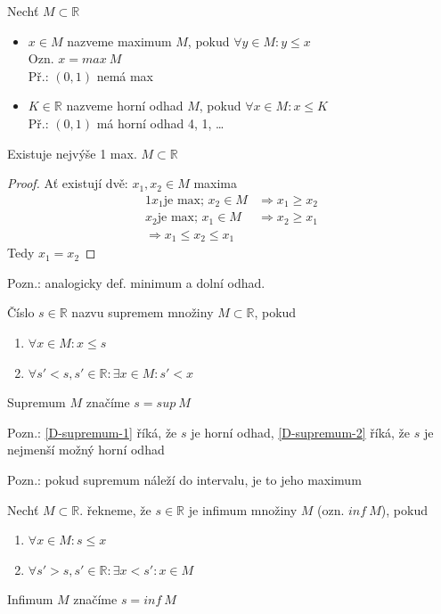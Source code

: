 \begin{definition}[Maximum]
	Nechť $M\subset\mathbb{R}$
	\begin{itemize}
		\item $x\in M$ nazveme maximum $M$, pokud $\forall y\in M: y\leq x$ \\
			Ozn. $x=max~M$ \\
			Př.: $(0,1)$ nemá max
		\item $K\in\mathbb{R}$ nazveme horní odhad $M$, pokud $\forall x\in M: x\leq K$ \\
			Př.: $(0,1)$ má horní odhad 4, 1, \dots
	\end{itemize}
\end{definition}

\begin{lemma}
	Existuje nejvýše 1 max. $M\subset\mathbb{R}$
\end{lemma}
\begin{proof}
	Ať existují dvě: $x_1, x_2\in M$ maxima
	\begin{alignat}{1}
		x_1 \text{je max; }x_2\in M &\Rightarrow x_1\geq x_2 \\
		x_2 \text{je max; }x_1\in M &\Rightarrow x_2\geq x_1 \\
		\Rightarrow x_1\leq x_2\leq x_1
	\end{alignat}
	Tedy $x_1=x_2$
\end{proof}

Pozn.: analogicky def. minimum a dolní odhad.

\begin{definition}[Supremum]
	Číslo $s\in\mathbb{R}$ nazvu supremem množiny $M\subset\mathbb{R}$, pokud
	\begin{enumerate}[I]
		\item\label{D-supremum-1} $\forall x\in M: x\leq s$
		\item\label{D-supremum-2} $\forall s'<s, s'\in\mathbb{R}: \exists x\in M: s'<x$
	\end{enumerate}
	Supremum $M$ značíme $s=sup~M$
\end{definition}

Pozn.: \ref{D-supremum-1} říká, že $s$ je horní odhad, \ref{D-supremum-2} říká,
že $s$ je nejmenší možný horní odhad

Pozn.: pokud supremum náleží do intervalu, je to jeho maximum

\begin{definition}[Infimum]
	Nechť $M\subset\mathbb{R}$. řekneme, že $s\in\mathbb{R}$ je infimum množiny $M$
	(ozn. $inf~M$), pokud
	\begin{enumerate}[I]
		\item\label{D-infimum-1} $\forall x\in M: s\leq x$
		\item\label{D-infimum-2} $\forall s'>s, s'\in\mathbb{R}: \exists x<s': x\in M$
	\end{enumerate}
	Infimum $M$ značíme $s=inf~M$
\end{definition}

